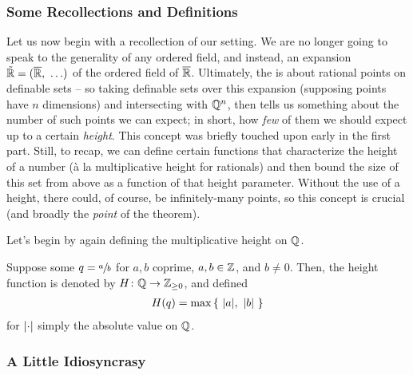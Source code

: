 

\subsubsection{Some Recollections and Definitions}

Let us now begin with a recollection of our setting. We are no longer going to speak to the generality of any ordered field, and instead, an \om expansion $\tilde{\mathbb{R}} = (\overline{\mathbb{R}}, \ \hdots)$ of the ordered field of $\overline{\mathbb{R}}$. Ultimately, the \pwt is about rational points on definable sets -- so taking definable sets over this expansion (supposing points have $n$ dimensions) and intersecting with $\mathbb{Q}^n$, then \pw tells us something about the number of such points we can expect; in short, how \emph{few} of them we should expect up to a certain \emph{height}. This concept was briefly touched upon early in the first part. Still, to recap, we can define certain functions that characterize the height of a number (\`a la multiplicative height for rationals) and then bound the size of this set from above as a function of that height parameter. Without the use of a height, there could, of course, be infinitely-many points, so this concept is crucial (and broadly the \emph{point} of the theorem).

Let's begin by again defining the multiplicative height on $\mathbb{Q}$.
\begin{definition}
  Suppose some $q = \sfrac{a}{b}$ for $a, b$ coprime, $a, b \in \mathbb{Z}$, and $b \neq 0$. Then, the height function is denoted by $H \colon \mathbb{Q} \to \mathbb{Z}_{\geq 0}$, and defined
    \begin{align*}
      H(q) = \max{ \left\{ \ \vert a\vert, \ \vert b\vert \ \right\} }
    \end{align*}
    for $\norm{\cdot}$ simply the absolute value on $\mathbb{Q}$.
  \label{defn:Q_height}
\end{definition}

\subsubsection{A Little Idiosyncrasy}

